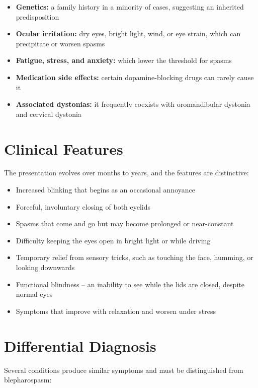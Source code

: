 \begin{itemize}
    \item \textbf{Genetics:} a family history in a minority of cases, suggesting an inherited predisposition
    \item \textbf{Ocular irritation:} dry eyes, bright light, wind, or eye strain, which can precipitate or worsen spasms
    \item \textbf{Fatigue, stress, and anxiety:} which lower the threshold for spasms
    \item \textbf{Medication side effects:} certain dopamine-blocking drugs can rarely cause it
    \item \textbf{Associated dystonias:} it frequently coexists with oromandibular dystonia and cervical dystonia
\end{itemize}

\section*{Clinical Features}
The presentation evolves over months to years, and the features are distinctive:

\begin{itemize}
    \item Increased blinking that begins as an occasional annoyance
    \item Forceful, involuntary closing of both eyelids
    \item Spasms that come and go but may become prolonged or near-constant
    \item Difficulty keeping the eyes open in bright light or while driving
    \item Temporary relief from sensory tricks, such as touching the face, humming, or looking downwards
    \item Functional blindness -- an inability to see while the lids are closed, despite normal eyes
    \item Symptoms that improve with relaxation and worsen under stress
\end{itemize}

\section*{Differential Diagnosis}
Several conditions produce similar symptoms and must be distinguished from blepharospasm:

